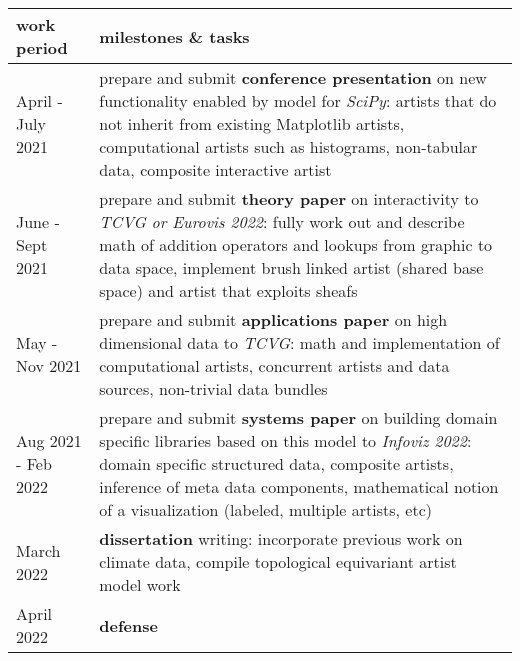 \documentclass[../main.tex]{subfiles}
\begin{document}
\begin{table}[H]
    \centering
    \renewcommand{\arraystretch}{2}
    \begin{tabularx}{\textwidth}{|l|X|}\hline
    \textbf{work period} & \textbf{milestones \& tasks} \\ \hline
    April - July 2021  & prepare and submit \textbf{conference presentation} on new functionality enabled by model for \textit{SciPy}: \newline artists that do not inherit from existing Matplotlib artists, computational artists such as histograms, non-tabular data, composite interactive artist \\ \hline
    June - Sept 2021  & prepare and submit \textbf{theory paper} on interactivity to \textit{TCVG or Eurovis 2022}: \newline fully work out and describe math of addition operators and lookups from graphic to data space, implement brush linked artist (shared base space) and artist that exploits sheafs \\ \hline
    May - Nov 2021 & prepare and submit \textbf{applications paper} on high dimensional data to \textit{TCVG}: \newline math and implementation of computational artists, concurrent artists and data sources, non-trivial data bundles \\ \hline 
    Aug 2021 - Feb 2022 & prepare and submit \textbf{systems paper} on building domain specific libraries based on this model to \textit{Infoviz 2022}: \newline domain specific structured data, composite artists, inference of meta data components, mathematical notion of a visualization (labeled, multiple artists, etc)\\ \hline
    March 2022 & \textbf{dissertation} writing: \newline incorporate previous work on climate data, compile topological equivariant artist model work \\ \hline
    April 2022 & \textbf{defense} \\ \hline
    \end{tabularx}
    \caption{}
    \label{tab:code:schedule}
\end{table}
\end{document}
